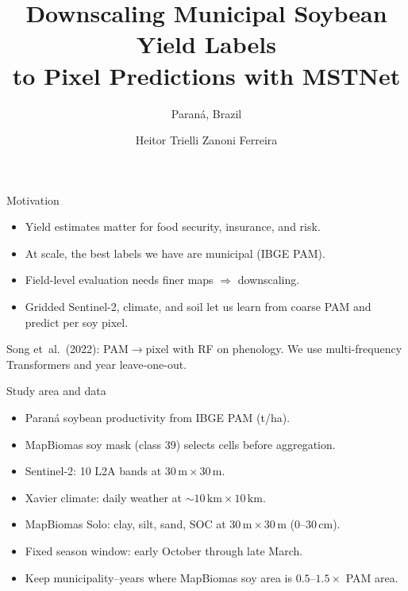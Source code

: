 \documentclass[aspectratio=169,11pt]{beamer}
\title{Downscaling Municipal Soybean Yield Labels\\to Pixel Predictions with MSTNet}
\subtitle{Paran\'{a}, Brazil}
\author{Heitor Trielli Zanoni Ferreira}
\date{}
\begin{document}
\begin{frame}
  \titlepage
\end{frame}

\begin{frame}{Motivation}
  \begin{itemize}
    \item Yield estimates matter for food security, insurance, and risk.
    \item At scale, the best labels we have are municipal (IBGE PAM).
    \item Field-level evaluation needs finer maps $\Rightarrow$ downscaling.
    \item Gridded Sentinel-2, climate, and soil let us learn from coarse PAM and predict per soy pixel.
  \end{itemize}
  \vspace{0.7em}
  {\footnotesize Song et~al.\ (2022): PAM$\to$pixel with RF on phenology.
  We use multi-frequency Transformers and year leave-one-out.}
\end{frame}

\begin{frame}{Study area and data}
  \begin{itemize}
    \item Paran\'{a} soybean productivity from IBGE PAM (\si{t/ha}).
    \item MapBiomas soy mask (class 39) selects cells before aggregation.
    \item Sentinel-2: 10 L2A bands at $30\,\mathrm{m}\times 30\,\mathrm{m}$.
    \item Xavier climate: daily weather at $\sim 10\,\mathrm{km}\times 10\,\mathrm{km}$.
    \item MapBiomas Solo: clay, silt, sand, SOC at $30\,\mathrm{m}\times 30\,\mathrm{m}$ (0--30\,cm).
    \item Fixed season window: early October through late March.
    \item Keep municipality--years where MapBiomas soy area is $0.5$--$1.5\times$ PAM area.
  \end{itemize}
\end{frame}
\end{document}
